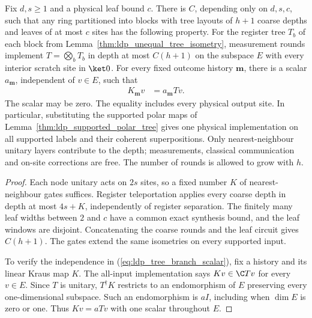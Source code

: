 \begin{lemma}
    \label{thm:ldp_supported_tree_rounds}
    \leanok
    Fix $d,s\ge1$ and a physical leaf bound $c$.
    There is $C$, depending only on $d,s,c$, such that any ring partitioned
    into blocks with tree layouts of $h+1$ coarse depths and leaves of at most
    $c$ sites has the following property. For the register tree $T_b$ of each
    block from Lemma~\ref{thm:ldp_unequal_tree_isometry}, measurement rounds
    implement $T=\bigotimes_bT_b$ in depth at most $C(h+1)$ on the subspace
    $E$ with every interior scratch site in $\ket0$.
    For every fixed outcome history $\mathbf m$, there is a scalar
    $a_{\mathbf m}$, independent of $v\in E$, such that
    \begin{align}
        K_{\mathbf m}v & =a_{\mathbf m}Tv.
        \label{eq:ldp_tree_branch_scalar}
    \end{align}
    The scalar may be zero. The equality includes every physical output site.
    In particular, substituting the supported polar maps of
    Lemma~\ref{thm:ldp_supported_polar_tree} gives one physical
    implementation on all supported labels and their coherent superpositions.
    Only nearest-neighbour unitary layers contribute to the depth;
    measurements, classical communication and on-site corrections are free.
    The number of rounds is allowed to grow with $h$.
\end{lemma}
\begin{proof}
    \leanok
    Each node unitary acts on $2s$ sites, so a fixed number $K$ of
    nearest-neighbour gates suffices. Register teleportation applies every
    coarse depth in depth at most $4s+K$, independently of register separation.
    The finitely many leaf widths between $2$ and $c$ have a common exact
    synthesis bound, and the leaf windows are disjoint.
    Concatenating the coarse rounds and the leaf circuit gives $C(h+1)$.
    The gates extend the same isometries on every supported input.

    To verify the independence in (\ref{eq:ldp_tree_branch_scalar}), fix a
    history and its linear Kraus map $K$. The all-input implementation says
    $Kv\in\C Tv$ for every $v\in E$. Since $T$ is unitary,
    $T^\dagger K$ restricts to an endomorphism of $E$ preserving every
    one-dimensional subspace. Such an endomorphism is $aI$, including when
    $\dim E$ is zero or one. Thus $Kv=aTv$ with one scalar throughout $E$.
\end{proof}

